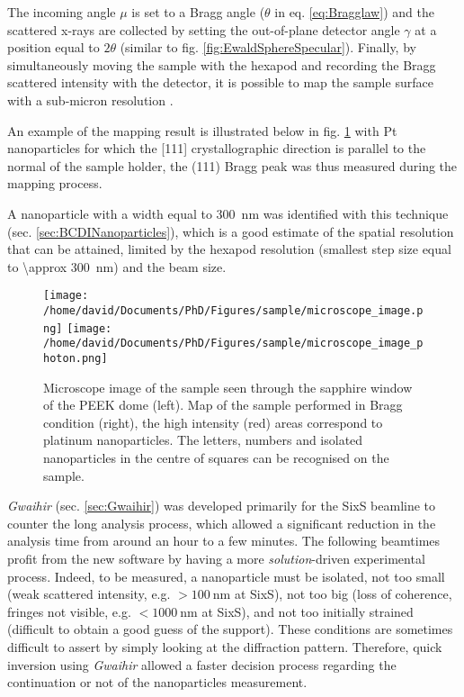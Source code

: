 The incoming angle $\mu$ is set to a Bragg angle ($\theta$ in eq. \ref{eq:Bragglaw}) and the scattered x-rays are collected by setting the out-of-plane detector angle $\gamma$ at a position equal to $2\theta$ (similar to fig. \ref{fig:EwaldSphereSpecular}).
Finally, by simultaneously moving the sample with the hexapod and recording the Bragg scattered intensity with the detector, it is possible to map the sample surface with a sub-micron resolution \parencite{Chahine2014}.

An example of the mapping result is illustrated below in fig. \ref{fig:SampleMapping} with Pt nanoparticles for which the [111] crystallographic direction is parallel to the normal of the sample holder, the (111) Bragg peak was thus measured during the mapping process.

A nanoparticle with a width equal to \qty{300}{\nm} was identified with this technique (sec. \ref{sec:BCDINanoparticles}), which is a good estimate of the spatial resolution that can be attained, limited by the hexapod resolution (smallest step size equal to \qty{\approx 300}{\nm}) and the beam size.

\begin{figure}[!htb]
    \centering
    \texttt{[image: /home/david/Documents/PhD/Figures/sample/microscope\_image.png]}
    \texttt{[image: /home/david/Documents/PhD/Figures/sample/microscope\_image\_photon.png]}
    \caption{
        Microscope image of the sample seen through the sapphire window of the PEEK dome (left).
        Map of the sample performed in Bragg condition (right), the high intensity (red) areas correspond to platinum nanoparticles.
        The letters, numbers and isolated nanoparticles in the centre of squares can be recognised on the sample.
    }
    \label{fig:SampleMapping}
\end{figure}

\textit{Gwaihir} (sec. \ref{sec:Gwaihir}) was developed primarily for the SixS beamline to counter the long analysis process, which allowed a significant reduction in the analysis time from around an hour to a few minutes.
The following beamtimes profit from the new software by having a more \textit{solution}-driven experimental process.
Indeed, to be measured, a nanoparticle must be isolated, not too small (weak scattered intensity, e.g. $>\qty{100}{\nm}$ at SixS), not too big (loss of coherence, fringes not visible, e.g. $<\qty{1000}{\nm}$ at SixS), and not too initially strained (difficult to obtain a good guess of the support).
These conditions are sometimes difficult to assert by simply looking at the diffraction pattern.
Therefore, quick inversion using \textit{Gwaihir} allowed a faster decision process regarding the continuation or not of the nanoparticles measurement.

